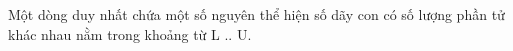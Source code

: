 Một dòng duy nhất chứa một số nguyên thể hiện số dãy con có số lượng phần tử khác nhau nằm trong khoảng từ L .. U.